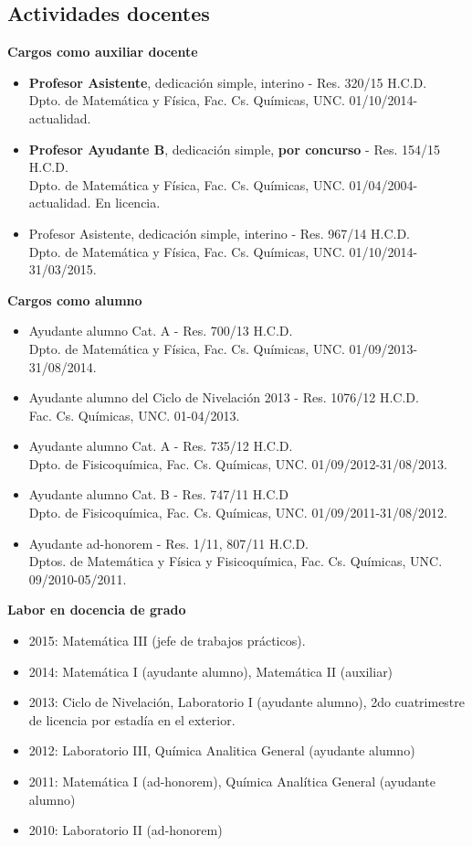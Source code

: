 \documentclass[10pt]{article}
\begin{document}
\subsection{Actividades docentes}
{\bf Cargos como auxiliar docente}
\begin{itemize}
 \item {\bf Profesor Asistente}, dedicación simple, interino - Res. 320/15 H.C.D. \\ Dpto. de Matemática y Física, Fac. Cs. Químicas, UNC. 01/10/2014-actualidad.
 \item {\bf Profesor Ayudante B}, dedicación simple, {\bf por concurso} - Res. 154/15 H.C.D. \\ Dpto. de Matemática y Física, Fac. Cs. Químicas, UNC. 01/04/2004-actualidad. En licencia.
 \item { Profesor Asistente}, dedicación simple, interino - Res. 967/14 H.C.D. \\ Dpto. de Matemática y Física, Fac. Cs. Químicas, UNC. 01/10/2014-31/03/2015.
\end{itemize}
{\bf Cargos como alumno}
\begin{itemize}
 \item { Ayudante alumno Cat. A} - Res. 700/13 H.C.D. \\ Dpto. de Matemática y Física, Fac. Cs. Químicas, UNC. 01/09/2013-31/08/2014.
 \item { Ayudante alumno del Ciclo de Nivelación 2013} - Res. 1076/12 H.C.D. \\ Fac. Cs. Químicas, UNC. 01-04/2013.
 \item { Ayudante alumno Cat. A} - Res. 735/12 H.C.D. \\ Dpto. de Fisicoquímica, Fac. Cs. Químicas, UNC. 01/09/2012-31/08/2013.
 \item { Ayudante alumno Cat. B} - Res. 747/11 H.C.D \\ Dpto. de Fisicoquímica, Fac. Cs. Químicas, UNC. 01/09/2011-31/08/2012.
 \item { Ayudante ad-honorem} - Res. 1/11, 807/11 H.C.D. \\ Dptos. de Matemática y Física y Fisicoquímica, Fac. Cs. Químicas, UNC. 09/2010-05/2011.
\end{itemize}
{\bf Labor en docencia de grado}
\begin{itemize}
 \item 2015: Matemática III (jefe de trabajos prácticos).
 \item 2014: Matemática I (ayudante alumno), Matemática II (auxiliar)
 \item 2013: Ciclo de Nivelación, Laboratorio I (ayudante alumno), 2do cuatrimestre de licencia por estadía en el exterior.
 \item 2012: Laboratorio III, Química Analitica General (ayudante alumno)
 \item 2011: Matemática I (ad-honorem), Química Analítica General (ayudante alumno)
 \item 2010: Laboratorio II (ad-honorem)
\end{itemize}
\end{document}
